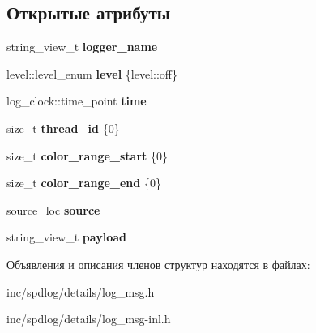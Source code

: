 \subsection*{Открытые атрибуты}
\begin{DoxyCompactItemize}
\item 
\mbox{\label{structspdlog_1_1details_1_1log__msg_a88ba7c1e423119fdb42957336f380277}} 
string\+\_\+view\+\_\+t {\bfseries logger\+\_\+name}
\item 
\mbox{\label{structspdlog_1_1details_1_1log__msg_a4142f4d66140a1ea24053311ebea5706}} 
level\+::level\+\_\+enum {\bfseries level} \{level\+::off\}
\item 
\mbox{\label{structspdlog_1_1details_1_1log__msg_a25fadb26e6ce94657af5475d4a581313}} 
log\+\_\+clock\+::time\+\_\+point {\bfseries time}
\item 
\mbox{\label{structspdlog_1_1details_1_1log__msg_ab8474cd689276f61021bca37e1993eef}} 
size\+\_\+t {\bfseries thread\+\_\+id} \{0\}
\item 
\mbox{\label{structspdlog_1_1details_1_1log__msg_a87cb1c5f1ecd7415412722123e35d491}} 
size\+\_\+t {\bfseries color\+\_\+range\+\_\+start} \{0\}
\item 
\mbox{\label{structspdlog_1_1details_1_1log__msg_a0dfc2763f8e6b73ca34e4cb7c5a9950a}} 
size\+\_\+t {\bfseries color\+\_\+range\+\_\+end} \{0\}
\item 
\mbox{\label{structspdlog_1_1details_1_1log__msg_a607e0014c79c1d39e28b515662ca2ca1}} 
\hyperlink{structspdlog_1_1source__loc}{source\+\_\+loc} {\bfseries source}
\item 
\mbox{\label{structspdlog_1_1details_1_1log__msg_a3f3bc29f5bf45e8a3dc976d544b8faed}} 
string\+\_\+view\+\_\+t {\bfseries payload}
\end{DoxyCompactItemize}


Объявления и описания членов структур находятся в файлах\+:\begin{DoxyCompactItemize}
\item 
inc/spdlog/details/log\+\_\+msg.\+h\item 
inc/spdlog/details/log\+\_\+msg-\/inl.\+h\end{DoxyCompactItemize}
